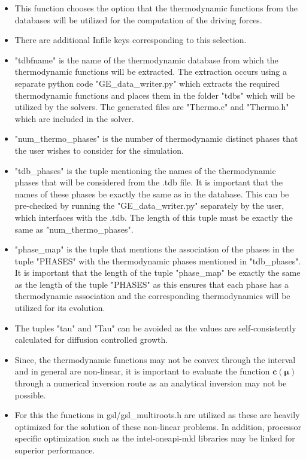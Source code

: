 \documentclass[a4paper,10pt]{article}
\begin{document}
\begin{itemize}
 \item This function chooses the option that the thermodynamic functions from the databases will be utilized for the computation of the driving forces.
 \item There are additional Infile keys corresponding to this selection.
 \item "tdbfname" is the name of the thermodynamic database from which the thermodynamic functions will be extracted. The extraction occurs using a separate
 python code "GE\_data\_writer.py" which extracts the required thermodynamic functions and places them in the folder "tdbs" which will be utilized by the 
 solvers. The generated files are "Thermo.c" and "Thermo.h" which are included in the solver. 
 \item "num\_thermo\_phases" is the number of thermodynamic distinct phases that the user wishes to consider for the simulation.
 \item "tdb\_phases" is the tuple mentioning the names of the thermodynamic phases that will be considered from the .tdb file. It is important that the 
 names of these phases be exactly the same as in the database. This can be pre-checked by running the "GE\_data\_writer.py" separately by the user, which 
 interfaces with the .tdb. The length of this tuple must be exactly the same as "num\_thermo\_phases".
 \item "phase\_map" is the tuple that mentions the association of the phases in the tuple "PHASES" with the thermodynamic phases mentioned in "tdb\_phases".
 It is important that the length of the tuple "phase\_map" be exactly the same as the length of the tuple "PHASES" as this ensures that each phase has a 
 thermodynamic association and the corresponding thermodynamics will be utilized for its evolution.
 \item The tuples "tau" and "Tau" can be avoided as the values are self-consistently calculated for diffusion controlled growth.
 \item Since, the thermodynamic functions may not be convex through the interval and in general are non-linear, it is important to evaluate the function 
 $\mathbf{c}\left(\mathbf{\mu}\right)$ through a numerical inversion route as an analytical inversion may not be possible. 
 \item For this the functions in gsl/gsl\_multiroots.h are utilized as these are heavily optimized for the solution of these non-linear problems. In addition,
 processor specific optimization such as the intel-oneapi-mkl libraries may be linked for superior performance. 

\end{itemize}
\end{document}
